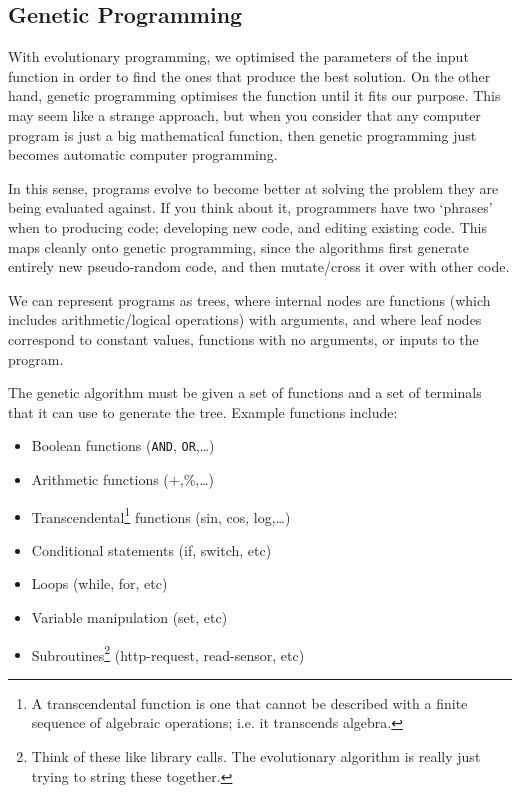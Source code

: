 
\subsection{Genetic Programming}

With evolutionary programming, we optimised the parameters of the
input function in order to find the ones that produce the best
solution. On the other hand, genetic programming optimises the
function until it fits our purpose. This may seem like a strange
approach, but when you consider that any computer program is just a
big mathematical function, then genetic programming just becomes
automatic computer programming.

In this sense, programs evolve to become better at solving the problem
they are being evaluated against. If you think about it, programmers
have two `phrases' when to producing code; developing new code, and
editing existing code. This maps cleanly onto genetic programming,
since the algorithms first generate entirely new pseudo-random code,
and then mutate/cross it over with other code.

We can represent programs as trees, where internal nodes are functions
(which includes arithmetic/logical operations) with arguments, and
where leaf nodes correspond to constant values, functions with no
arguments, or inputs to the program.

The genetic algorithm must be given a set of functions and a set of
terminals that it can use to generate the tree. Example functions
include:

\begin{itemize}
\item Boolean functions (\texttt{AND}, \texttt{OR},\dots)
\item Arithmetic functions ($+$,$\%$,\dots)
\item Transcendental\footnote{A transcendental function is one that
cannot be described with a finite sequence of algebraic operations;
i.e. it transcends algebra.} functions (sin, cos, log,\dots)
\item Conditional statements (if, switch, etc)
\item Loops (while, for, etc)
\item Variable manipulation (set, etc)
\item Subroutines\footnote{Think of these like library calls. The
evolutionary algorithm is really just trying to string these
together.} (http-request, read-sensor, etc)
\end{itemize}

